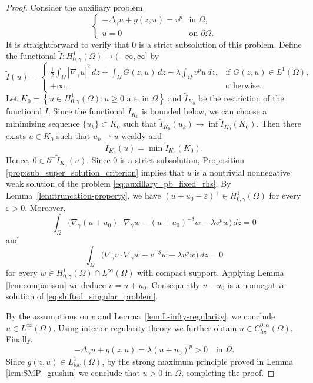 \documentclass[11pt]{article}
\newcommand{\om} {\Omega}
\newcommand{\Gr}{\Delta_{\gamma}}
\newcommand{\gradgr}{\nabla_{\gamma}}
\newcommand{\spacegr}{H^{1}_{0,\gamma}(\Omega)}
\begin{document}
\begin{proof}
Consider the auxiliary problem 
\begin{equation}\label{eq:auxillary_pb_fixed_rhs}
\begin{cases}
-\Gr u + g(z,u) = v^p & \text{in } \Omega,\\
u = 0 & \text{on } \partial\Omega .
\end{cases}
\end{equation}
It is straightforward to verify that $0$ is a strict subsolution of this problem. Define the functional $\tilde I:\spacegr\to(-\infty,\infty]$ by
\begin{equation*}
\tilde I(u)=
\begin{cases}
\displaystyle
\frac12\int_\Omega |\gradgr u|^2\,dz
+ \int_\Omega G(z,u)\,dz
- \lambda\int_\Omega v^p u\,dz,
& \text{if } G(z,u)\in L^1(\Omega),\\[1.2ex]
+\infty, & \text{otherwise}.
\end{cases}
\end{equation*}
Let $K_{0} = \left\{ u \in \spacegr : u \geq 0 \text{ a.e. in } \om \right\}$ and $\tilde{I}_{K_0}$ be the restriction of the functional $\tilde{I}$. Since the functional $\tilde{I}_{K_0}$ is bounded below, we can choose a minimizing sequence $\{u_k\}\subset K_0$ such that $\tilde I_{K_0}(u_k) \to \inf \tilde I_{ K_0}(K_0)$. Then there exists $u\in K_0$ such that $u_k \rightharpoonup u$ weakly and
\[
\tilde I_{K_0}(u)=\min \tilde I_{K_0}(K_0).
\]
Hence, $0\in \partial^- \tilde I_{K_0}(u)$. Since $0$ is a strict subsolution, Proposition \ref{prop:sub_super_solution_criterion} implies that $u$ is a nontrivial nonnegative weak solution of the problem \eqref{eq:auxillary_pb_fixed_rhs}.  
By Lemma~\ref{lem:truncation-property}, we have $(u+u_{0}-\varepsilon)^+ \in \spacegr$ for every $\varepsilon>0$. Moreover,
\begin{equation*}
\int_\Omega \big(\gradgr(u+u_{0})\cdot\gradgr w
-(u+u_{0})^{-\delta}w
-\lambda v^p w\big)\,dz=0
\end{equation*}
and
\begin{equation*}
\int_\Omega \big(\gradgr v\cdot\gradgr w
-v^{-\delta}w
-\lambda v^p w\big)\,dz=0
\end{equation*}
for every $w\in \spacegr\cap L^\infty(\Omega)$ with compact support. Applying Lemma \ref{lem:comparison} we deduce $v = u+u_{0}$. Consequently $v - u_{0}$ is a nonnegative solution of \eqref{eq:shifted_singular_problem}.

By the assumptions on $v$ and Lemma~\ref{lem:L-infty-regularity}, we conclude $u\in L^\infty(\Omega)$. Using interior regularity theory we further obtain $u\in C_{loc}^{0,\alpha}(\Omega)$. Finally,
\begin{equation*}
-\Gr u + g(z,u)
= \lambda (u+u_{0})^p >0
\quad \text{in }\Omega .
\end{equation*}
Since $g(z,u) \in L_{loc}^{1}(\om)$, by the strong maximum principle proved in Lemma \ref{lem:SMP_grushin} we conclude that $u>0$ in $\Omega$, completing the proof.
\end{proof}




\end{document}

